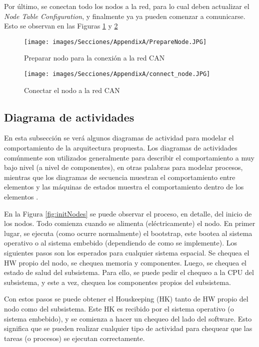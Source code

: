Por último, se conectan todo los nodos a la red, para lo cual deben
actualizar el \textit{Node Table Configuration}, y finalmente ya
ya pueden comenzar a comunicarse. Esto se observan en las Figuras
\ref{fig:PrepareNodeC5} y \ref{fig:ConnectNodeC5}

\begin{figure}[h!]
 \centering
 \texttt{[image: images/Secciones/AppendixA/PrepareNode.JPG]}
  \caption{Preparar nodo para la conexión a la red CAN}
  \label{fig:PrepareNodeC5}
\end{figure}

\begin{figure}[h!]
 \centering
 \texttt{[image: images/Secciones/AppendixA/connect\_node.JPG]}
  \caption{Conectar el nodo a la red CAN}
  \label{fig:ConnectNodeC5}
\end{figure}

\subsection{Diagrama de actividades}
En esta subsección se verá algunos diagramas de actividad para modelar
el comportamiento de la arquitectura propuesta. Los diagramas de actividades
comúnmente son utilizados generalmente para describir el comportamiento
a muy bajo nivel (a nivel de componentes), en otras palabras para modelar
procesos, mientras que los diagramas de secuencia muestran el comportamiento
entre elementos y las máquinas de estados  muestra el comportamiento
dentro de los elementos \citep{HoltPery}.

En la Figura \ref{fig:initNodes} se puede observar el proceso, en detalle,
del inicio de los nodos. Todo comienza cuando se alimenta (eléctricamente)
el nodo. En primer lugar, se ejecuta (como ocurre normalmente) el bootstrap,
este bootea al sistema operativo o al sistema embebido (dependiendo de como
se implemente). Los siguientes pasos son los esperados para cualquier sistema
espacial. Se chequea el \ac{HW} propio del nodo, se chequea memoria y componentes.
Luego, se chequea el estado de salud del subsistema. Para ello, se puede pedir
el chequeo a la CPU del subsistema, y este a vez, chequea los componentes
propios del subsistema.

Con estos pasos se puede obtener el Houskeeping (HK) tanto de \ac{HW} propio del nodo
como del subsistema. Este HK es recibido por el sistema operativo
(o sistema embebido), y se comienza a hacer un chequeo del lado del
software. Esto significa que se pueden realizar cualquier tipo de actividad
para chequear que las tareas (o procesos) se ejecutan correctamente.

